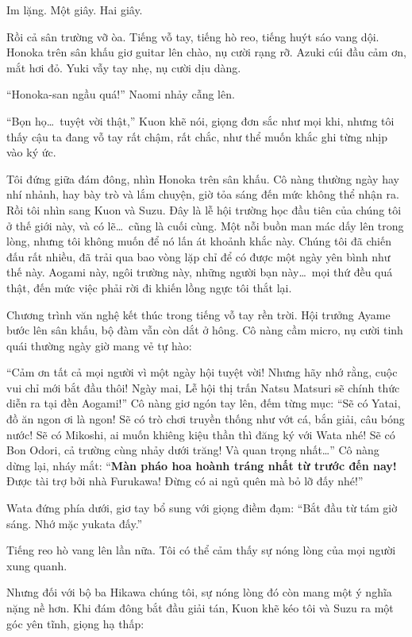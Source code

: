 \documentclass[../main.tex]{subfiles}
\begin{document}
Im lặng. Một giây. Hai giây.

Rồi cả sân trường vỡ òa. Tiếng vỗ tay, tiếng hò reo, tiếng huýt sáo vang dội. Honoka trên sân khấu giơ guitar lên chào, nụ cười rạng rỡ. Azuki cúi đầu cảm ơn, mắt hơi đỏ. Yuki vẫy tay nhẹ, nụ cười dịu dàng.

``Honoka-san ngầu quá!'' Naomi nhảy cẫng lên.

``Bọn họ\dots\ tuyệt vời thật,'' Kuon khẽ nói, giọng đơn sắc như mọi khi, nhưng tôi thấy cậu ta đang vỗ tay rất chậm, rất chắc, như thể muốn khắc ghi từng nhịp vào ký ức.

Tôi đứng giữa đám đông, nhìn Honoka trên sân khấu. Cô nàng thường ngày hay nhí nhảnh, hay bày trò và lắm chuyện, giờ tỏa sáng đến mức không thể nhận ra. Rồi tôi nhìn sang Kuon và Suzu. Đây là lễ hội trường học đầu tiên của chúng tôi ở thế giới này, và có lẽ\dots\ cũng là cuối cùng. Một nỗi buồn man mác dấy lên trong lòng, nhưng tôi không muốn để nó lấn át khoảnh khắc này. Chúng tôi đã chiến đấu rất nhiều, đã trải qua bao vòng lặp chỉ để có được một ngày yên bình như thế này. Aogami này, ngôi trường này, những người bạn này\dots\ mọi thứ đều quá thật, đến mức việc phải rời đi khiến lồng ngực tôi thắt lại.

Chương trình văn nghệ kết thúc trong tiếng vỗ tay rền trời. Hội trưởng Ayame bước lên sân khấu, bộ đàm vẫn còn dắt ở hông. Cô nàng cầm micro, nụ cười tinh quái thường ngày giờ mang vẻ tự hào:

``Cảm ơn tất cả mọi người vì một ngày hội tuyệt vời! Nhưng hãy nhớ rằng, cuộc vui chỉ mới bắt đầu thôi! Ngày mai, Lễ hội thị trấn Natsu Matsuri sẽ chính thức diễn ra tại đền Aogami!'' Cô nàng giơ ngón tay lên, đếm từng mục: ``Sẽ có Yatai, đồ ăn ngon ơi là ngon! Sẽ có trò chơi truyền thống như vớt cá, bắn giải, câu bóng nước! Sẽ có Mikoshi, ai muốn khiêng kiệu thần thì đăng ký với Wata nhé! Sẽ có Bon Odori, cả trường cùng nhảy dưới trăng! Và quan trọng nhất\dots'' Cô nàng dừng lại, nháy mắt: ``\textbf{Màn pháo hoa hoành tráng nhất từ trước đến nay!} Được tài trợ bởi nhà Furukawa! Đừng có ai ngủ quên mà bỏ lỡ đấy nhé!''

Wata đứng phía dưới, giơ tay bổ sung với giọng điềm đạm: ``Bắt đầu từ tám giờ sáng. Nhớ mặc yukata đấy.''

Tiếng reo hò vang lên lần nữa. Tôi có thể cảm thấy sự nóng lòng của mọi người xung quanh.

Nhưng đối với bộ ba Hikawa chúng tôi, sự nóng lòng đó còn mang một ý nghĩa nặng nề hơn. Khi đám đông bắt đầu giải tán, Kuon khẽ kéo tôi và Suzu ra một góc yên tĩnh, giọng hạ thấp:
\end{document}

